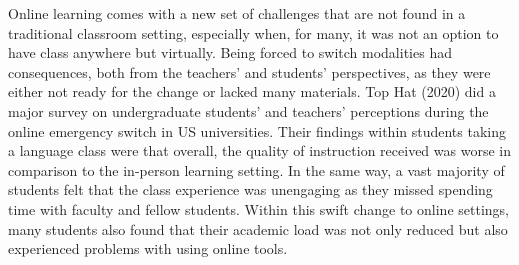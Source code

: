 \documentclass[
  man]{apa6}
\begin{document}
Online learning comes with a new set of challenges that are not found in a traditional classroom setting, especially when, for many, it was not an option to have class anywhere but virtually. Being forced to switch modalities had consequences, both from the teachers' and students' perspectives, as they were either not ready for the change or lacked many materials. Top Hat (2020) did a major survey on undergraduate students' and teachers' perceptions during the online emergency switch in US universities. Their findings within students taking a language class were that overall, the quality of instruction received was worse in comparison to the in-person learning setting. In the same way, a vast majority of students felt that the class experience was unengaging as they missed spending time with faculty and fellow students. Within this swift change to online settings, many students also found that their academic load was not only reduced but also experienced problems with using online tools.
\end{document}
